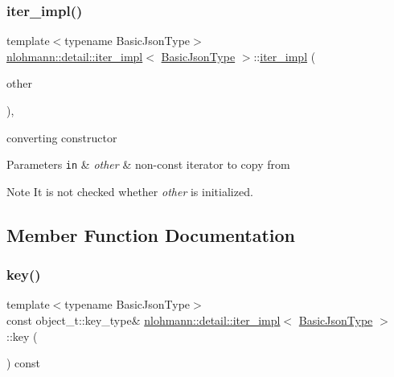 \subsubsection{\texorpdfstring{iter\+\_\+impl()}{iter\_impl()}\hspace{0.1cm}{\footnotesize\ttfamily [4/4]}}
{\footnotesize\ttfamily template$<$typename Basic\+Json\+Type$>$ \\
\hyperlink{classnlohmann_1_1detail_1_1iter__impl}{nlohmann\+::detail\+::iter\+\_\+impl}$<$ \hyperlink{classnlohmann_1_1detail_1_1iter__impl_abf18f18793f84b0222aebb5a2a87da7a}{Basic\+Json\+Type} $>$\+::\hyperlink{classnlohmann_1_1detail_1_1iter__impl}{iter\+\_\+impl} (\begin{DoxyParamCaption}\item[{const \hyperlink{classnlohmann_1_1detail_1_1iter__impl}{iter\+\_\+impl}$<$ typename std\+::remove\+\_\+const$<$ \hyperlink{classnlohmann_1_1detail_1_1iter__impl_abf18f18793f84b0222aebb5a2a87da7a}{Basic\+Json\+Type} $>$\+::type $>$ \&}]{other }\end{DoxyParamCaption})\hspace{0.3cm}{\ttfamily [inline]}, {\ttfamily [noexcept]}}



converting constructor 


\begin{DoxyParams}[1]{Parameters}
\mbox{\tt in}  & {\em other} & non-\/const iterator to copy from \\
\hline
\end{DoxyParams}
\begin{DoxyNote}{Note}
It is not checked whether {\itshape other} is initialized. 
\end{DoxyNote}


\subsection{Member Function Documentation}
\mbox{\label{classnlohmann_1_1detail_1_1iter__impl_a15dfb2744fed2ef40c12a9e9a20d6dbc}} 
\subsubsection{\texorpdfstring{key()}{key()}}
{\footnotesize\ttfamily template$<$typename Basic\+Json\+Type$>$ \\
const object\+\_\+t\+::key\+\_\+type\& \hyperlink{classnlohmann_1_1detail_1_1iter__impl}{nlohmann\+::detail\+::iter\+\_\+impl}$<$ \hyperlink{classnlohmann_1_1detail_1_1iter__impl_abf18f18793f84b0222aebb5a2a87da7a}{Basic\+Json\+Type} $>$\+::key (\begin{DoxyParamCaption}{ }\end{DoxyParamCaption}) const\hspace{0.3cm}{\ttfamily [inline]}}



